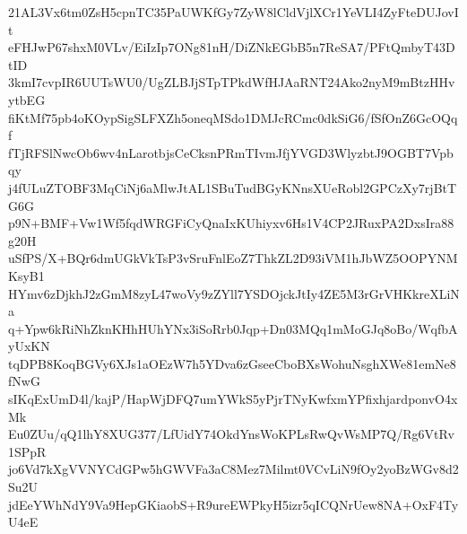 21AL3Vx6tm0ZsH5cpnTC35PaUWKfGy7ZyW8lCldVjlXCr1YeVLI4ZyFteDUJovIt
eFHJwP67shxM0VLv/EiIzIp7ONg81nH/DiZNkEGbB5n7ReSA7/PFtQmbyT43DtID
3kmI7cvpIR6UUTsWU0/UgZLBJjSTpTPkdWfHJAaRNT24Ako2nyM9mBtzHHvytbEG
fiKtMf75pb4oKOypSigSLFXZh5oneqMSdo1DMJcRCmc0dkSiG6/fSfOnZ6GcOQqf
fTjRFSlNwcOb6wv4nLarotbjsCeCksnPRmTIvmJfjYVGD3WlyzbtJ9OGBT7Vpbqy
j4fULuZTOBF3MqCiNj6aMlwJtAL1SBuTudBGyKNnsXUeRobl2GPCzXy7rjBtTG6G
p9N+BMF+Vw1Wf5fqdWRGFiCyQnaIxKUhiyxv6Hs1V4CP2JRuxPA2DxsIra88g20H
uSfPS/X+BQr6dmUGkVkTsP3vSruFnlEoZ7ThkZL2D93iVM1hJbWZ5OOPYNMKsyB1
HYmv6zDjkhJ2zGmM8zyL47woVy9zZYll7YSDOjckJtIy4ZE5M3rGrVHKkreXLiNa
q+Ypw6kRiNhZknKHhHUhYNx3iSoRrb0Jqp+Dn03MQq1mMoGJq8oBo/WqfbAyUxKN
tqDPB8KoqBGVy6XJs1aOEzW7h5YDva6zGseeCboBXsWohuNsghXWe81emNe8fNwG
sIKqExUmD4l/kajP/HapWjDFQ7umYWkS5yPjrTNyKwfxmYPfixhjardponvO4xMk
Eu0ZUu/qQ1lhY8XUG377/LfUidY74OkdYnsWoKPLsRwQvWsMP7Q/Rg6VtRv1SPpR
jo6Vd7kXgVVNYCdGPw5hGWVFa3aC8Mez7Milmt0VCvLiN9fOy2yoBzWGv8d2Su2U
jdEeYWhNdY9Va9HepGKiaobS+R9ureEWPkyH5izr5qICQNrUew8NA+OxF4TyU4eE
